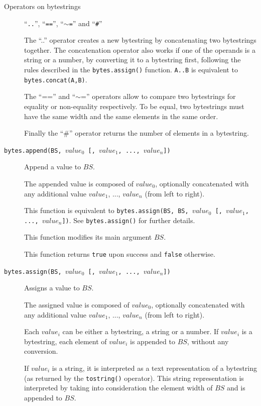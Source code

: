 \documentclass[11pt]{report}
\begin{document}
\begin{description}

\item[Operators on bytestrings]
{
  ``\texttt{..}'', ``\texttt{==}'', ``\texttt{$\sim$=}'' and ``\texttt{\#}''
  
  The ``..'' operator creates a new bytestring by concatenating two bytestrings together.
  The concatenation operator also works if one of the operands is a string or a number, 
  by converting it to a bytestring first, following the rules described in the 
  \texttt{bytes.assign()} function. 
  \texttt{A..B} is equivalent to \texttt{bytes.concat(A,B)}.
  
  The ``=='' and ``$\sim$='' operators allow to compare two bytestrings for equality or
  non-equality respectively. To be equal, two bytestrings must have the same width
  and the same elements in the same order.
 
  Finally the ``\#'' operator returns the number of elements in a bytestring.
}

\item[\texttt{bytes.append(BS, $value_0$ [, $value_1$, ..., $value_n$])}]
{
  Append a value to $BS$.

  The appended value is composed of $value_0$, optionally concatenated with
  any additional value $value_1$, ..., $value_n$ (from left to right).

  This function is equivalent to 
  \texttt{bytes.assign(BS, BS, $value_0$ [, $value_1$, ..., $value_n$])}.
  See \texttt{bytes.assign()} for further details.

  This function modifies its main argument $BS$.

  This function returns \texttt{true} upon success and \texttt{false} otherwise.
}

\item[\texttt{bytes.assign(BS, $value_0$ [, $value_1$, ..., $value_n$])}]
{
  Assigns a value to $BS$. 

  The assigned value is composed of $value_0$, optionally concatenated with 
  any additional value $value_1$, ..., $value_n$ (from left to right).

  Each $value_i$ can be either a bytestring, a string or a number.
  If $value_i$ is a bytestring, each element of $value_i$ is appended to $BS$, 
  without any conversion.

  If $value_i$ is a string, it is interpreted as a text representation of
  a bytestring (as returned by the \texttt{tostring()} operator). This string
  representation is interpreted by taking into consideration the element width 
  of $BS$ and is appended to $BS$.

}
\end{description}
\end{document}
